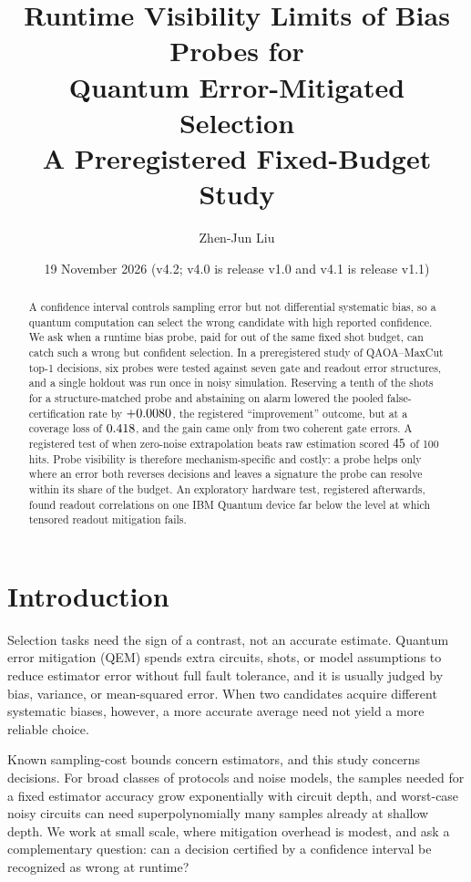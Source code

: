 \documentclass[10pt,twocolumn]{article}
\title{\textbf{Runtime Visibility Limits of Bias Probes for\\
Quantum Error-Mitigated Selection}\vspace{0.35em}\\
\large A Preregistered Fixed-Budget Study}
\author{Zhen-Jun Liu}
\date{19 November 2026 (v4.2; v4.0 is release v1.0 and v4.1 is release v1.1)}
\begin{document}
\maketitle

\begin{abstract}
A confidence interval controls sampling error but not differential systematic
bias, so a quantum computation can select the wrong candidate with high
reported confidence. We ask when a runtime bias probe, paid for out of the same
fixed shot budget, can catch such a wrong but confident selection. In a
preregistered study of QAOA--MaxCut top-1 decisions, six probes were tested
against seven gate and readout error structures, and a single holdout
was run once in noisy simulation. Reserving a tenth of the shots for a
structure-matched probe and abstaining on alarm lowered the pooled
false-certification rate by $+0.0080$, the registered ``improvement'' outcome,
but at a coverage loss of $0.418$, and the gain came only from two
coherent gate errors. A registered test of when zero-noise extrapolation beats
raw estimation scored $45$ of 100 hits. Probe visibility is
therefore mechanism-specific and costly: a probe helps only where an error both
reverses decisions and leaves a signature the probe can resolve within its
share of the budget. An exploratory hardware test, registered afterwards, found
readout correlations on one IBM Quantum device far below the level at which
tensored readout mitigation fails.
\end{abstract}

\section{Introduction}

Selection tasks need the sign of a contrast, not an accurate estimate. Quantum
error mitigation (QEM) spends extra circuits, shots, or model assumptions to
reduce estimator error without full fault
tolerance\cite{temme2017,li2017,endo2018,endo2021jpsj,cai2023}, and it is
usually judged by bias, variance, or mean-squared error. When two candidates
acquire different systematic biases, however, a more accurate average need not
yield a more reliable choice.

Known sampling-cost bounds concern estimators, and this study concerns
decisions. For broad classes of protocols and noise models, the samples needed
for a fixed estimator accuracy grow exponentially with circuit
depth\cite{takagi2022,takagi2023,tsubouchi2023}, and worst-case noisy circuits
can need superpolynomially many samples already at shallow
depth\cite{quek2024}. We work at small scale, where mitigation overhead is
modest, and ask a complementary question: can a decision certified by a
confidence interval be recognized as wrong at runtime?
\end{document}
